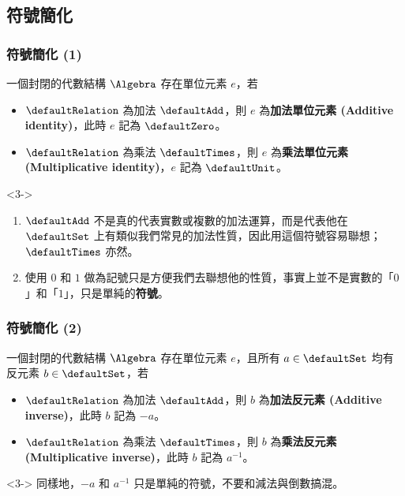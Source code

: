 \documentclass[utf8]{beamer}
\begin{document}
\begin{CJK}{UTF8}{bkai}
\subsection{符號簡化}

\begin{frame}
  \frametitle{符號簡化 (1)}
  \begin{mydef}[單位元素記號]
  \label{def:algebra:identity_notation}
  一個封閉的代數結構 $\Algebra$ 存在單位元素 $e$，若
  \begin{itemize}
  \item<1-> $\defaultRelation$ 為加法 $\defaultAdd$，則 $e$ 為\textbf{加法單位元素 (Additive identity)}，此時 $e$ 記為 $\defaultZero$。
  \item<2-> $\defaultRelation$ 為乘法 $\defaultTimes$，則 $e$ 為\textbf{乘法單位元素 (Multiplicative identity)}，$e$ 記為 $\defaultUnit$。
  \end{itemize}
  \end{mydef}
  \begin{mynote*}<3->
  \begin{enumerate}
  \item<3-> $\defaultAdd$ 不是真的代表實數或複數的加法運算，而是代表他在 $\defaultSet$ 上有類似我們常見的加法性質，因此用這個符號容易聯想；$\defaultTimes$ 亦然。
  \item<4-> 使用 $0$ 和 $1$ 做為記號只是方便我們去聯想他的性質，事實上並不是實數的「$0$」和「$1$」，只是單純的\textbf{符號}。
  \end{enumerate}
  \end{mynote*}
\end{frame}

\begin{frame}
  \frametitle{符號簡化 (2)}
  \begin{mydef}[反元素記號]
  \label{def:algebra:inverse_notation}
  一個封閉的代數結構 $\Algebra$ 存在單位元素 $e$，且所有 $a\in{\defaultSet}$ 均有反元素 $b\in{\defaultSet}$，若
  \begin{itemize}
  \item<1-> $\defaultRelation$ 為加法 $\defaultAdd$，則 $b$ 為\textbf{加法反元素 (Additive inverse)}，此時 $b$ 記為 $-a$。
  \item<2-> $\defaultRelation$ 為乘法 $\defaultTimes$，則 $b$ 為\textbf{乘法反元素 (Multiplicative inverse)}，此時 $b$ 記為 $a^{-1}$。
  \end{itemize}
  \end{mydef}
  \begin{mynote*}<3->
  同樣地，$-a$ 和 $a^{-1}$ 只是單純的符號，不要和減法與倒數搞混。
  \end{mynote*}
\end{frame}


\end{CJK}
\end{document}
